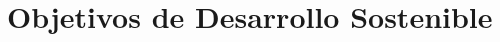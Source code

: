 \documentclass[11pt,spanish,listoffigures,listoftables]{tfgetsinf}
\begin{document}
\cleardoublepage


\APPENDIX













\chapter{Objetivos de Desarrollo Sostenible} \label{ch:ods}
\end{document}
